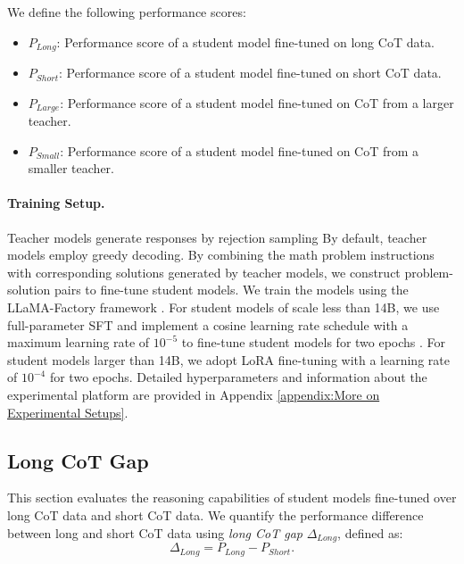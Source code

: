 We define the following performance scores:
\begin{itemize}
    \item \(P_{Long}\): Performance score of a student model fine-tuned on long CoT data.
    \item \(P_{Short}\): Performance score of a student model fine-tuned on short CoT data.
    \item \(P_{Large}\): Performance score of a student model fine-tuned on CoT from a larger teacher.
    \item \(P_{Small}\): Performance score of a student model fine-tuned on CoT from a smaller teacher.
\end{itemize}




\paragraph{Training Setup.} 
Teacher models generate responses by rejection sampling 
\citep{dong2023raftrewardrankedfinetuning, gulcehre2023reinforcedselftrainingrestlanguage, tong2024dartmathdifficultyawarerejectiontuning, yuan2023scalingrelationshiplearningmathematical, yue2023mammothbuildingmathgeneralist, zelikman2022starbootstrappingreasoningreasoning}
By default, teacher models employ greedy decoding.  
By combining the math problem instructions with corresponding solutions generated by teacher models, we construct problem-solution pairs to fine-tune student models. 
We train the models using the LLaMA-Factory framework \citep{zheng2024llamafactory}. 
For student models of scale less than 14B, we use full-parameter SFT and implement a cosine learning rate schedule with a maximum learning rate of $10^{-5}$ to fine-tune student models for two epochs \citep{touvron2023llama}. 
For student models larger than 14B, we adopt LoRA fine-tuning with a learning rate of $10^{-4}$ for two epochs. Detailed hyperparameters and information about the experimental platform are provided in Appendix \ref{appendix:More on Experimental Setups}.





\subsection{Long CoT Gap}
This section evaluates the reasoning capabilities of student models fine-tuned over long CoT data and short CoT data. We quantify the performance difference between long and short CoT data using \emph{long CoT gap} \(\Delta_{Long}\), defined as:
\begin{equation*}
\Delta_{Long} = P_{Long} - P_{Short}.
\end{equation*}

